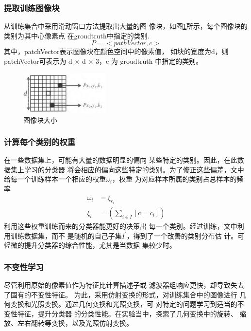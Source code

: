 \documentclass[UTF8,a4paper,10pt,nocolorlinks]{ctexart}
\begin{document}
\begin{multicols}{2}
    \subsubsection{提取训练图像块}
    从训练集合中采用滑动窗口方法提取出大量的图
像块，如图\ref{pic:block}所示，每个图像块的类别为其中心像素点
在groudtruth中指定的类别.
\begin{equation}
    P = < pathVector, c >
\end{equation}
其中，patchVector表示图像块在颜色空间中的像素值，
如块的宽度为d，则patchVector可表示为 d × d × 3，c
为 groudtruth 中指定的类别。
\begin{figure}[H]
    \centering %
    \includegraphics[width=0.4\textwidth]{pictures/pict_block.png} 
    \caption{图像块大小}
    \label{pic:block}
\end{figure}
\subsubsection{计算每个类别的权重}
在一些数据集上，可能有大量的数据明显的偏向
某些特定的类别。因此，在此数据集上学习的分类器
将会相应的偏向这些特定的类别。为了修正这些偏差，文中给每一个训练样本一个相应的权重$\omega_{i}$，权重
为对应样本所属的类别占总样本的频率
\begin{align}
    \omega_{i} &= \xi_{c_{i}} \\
    \xi_{c} &= ( \sum_{i \in I} [ c = c_{i} ] )
\end{align}
利用这些权重训练而来的分类器能更好的决策出
每一个类别。经过训练，文中利用训练数据集，而不
是随机的自己子集$I^{'}$，得到了一个改善的类别分布估
计。可轻微的提升分类器的综合性能，尤其是当数据
集较少时。
\subsubsection{不变性学习}
尽管利用原始的像素值作为特征比计算描述子或
滤波器组响应更快，却导致失去了固有的不变性特征。
为此，采用仿射变换的形式，对训练集合中的图像进行
几何变换和光照变换。通过几何变换和光照变换，可
对特定的问题学习到适当的不变性特征，提升分类器
的分类性能。在实验当中，探索了几何变换中的旋转、
缩放、左右翻转等变换，以及光照仿射变换。


\end{multicols}
\end{document}

